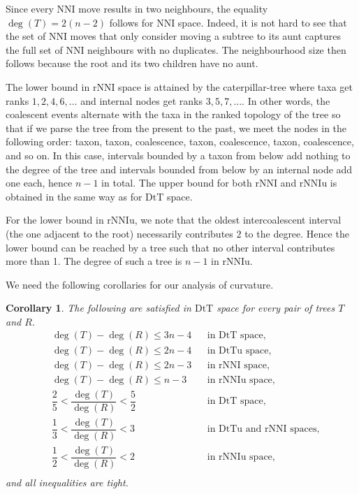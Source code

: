 \documentclass{amsart}
\newtheorem{corollary}[lemma]{Corollary}
\newcommand{\nni}{\mathrm{NNI}}
\newcommand{\rnni}{\mathrm{rNNI}}
\newcommand{\rnniu}{\mathrm{rNNIu}}
\newcommand{\mdts}{\mathrm{DtT}}
\newcommand{\mdtsu}{\mathrm{DtTu}}
\begin{document}
Since every NNI move results in two neighbours, the equality $\deg(T) = 2(n-2)$ follows for $\nni$ space.
Indeed, it is not hard to see that the set of NNI moves that only consider moving a subtree to its aunt captures the full set of NNI neighbours with no duplicates.
The neighbourhood size then follows because the root and its two children have no aunt.

The lower bound in $\rnni$ space is attained by the caterpillar-tree where taxa get ranks $1, 2, 4, 6, \ldots$ and internal nodes get ranks $3, 5, 7, \ldots$. 
In other words, the coalescent events alternate with the taxa in the ranked topology of the tree so that if we parse the tree from the present to the past, we meet the nodes in the following order: taxon, taxon, coalescence, taxon, coalescence, taxon, coalescence, and so on.
In this case, intervals bounded by a taxon from below add nothing to the degree of the tree and intervals bounded from below by an internal node add one each, hence $n-1$ in total.
The upper bound for both $\rnni$ and $\rnniu$ is obtained in the same way as for $\mdts$ space.

For the lower bound in $\rnniu$, we note that the oldest intercoalescent interval (the one adjacent to the root) necessarily contributes $2$ to the degree.
Hence the lower bound can be reached by a tree such that no other interval contributes more than 1.
The degree of such a tree is $n-1$ in $\rnniu$.
\endproof

We need the following corollaries for our analysis of curvature.

\begin{corollary}\label{degreeBounds}
	The following are satisfied in $\mdts$ space for every pair of trees $T$ and $R$.
\begin{align*}
& \deg(T)-\deg(R) \leq 3n-4		&& \mbox{in $\mdts$ space,}\\
& \deg(T)-\deg(R) \leq 2n-4		&& \mbox{in $\mdtsu$ space,}\\
& \deg(T)-\deg(R) \leq 2n-3		&& \mbox{in $\rnni$ space,}\\
& \deg(T)-\deg(R) \leq n-3			&& \mbox{in $\rnniu$ space,}\\
& \dfrac25 < \dfrac{\deg(T)}{\deg(R)} < \dfrac52		&& \mbox{in $\mdts$ space,}\\
& \dfrac13 < \dfrac{\deg(T)}{\deg(R)} < 3			&& \mbox{in $\mdtsu$ and $\rnni$ spaces,}\\
& \dfrac12 < \dfrac{\deg(T)}{\deg(R)} < 2			&& \mbox{in $\rnniu$ space,}\\
\end{align*}
and all inequalities are tight.
\end{corollary}
\end{document}
